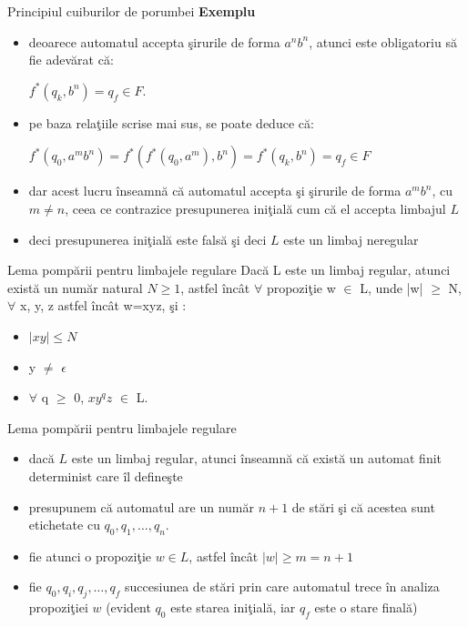 \documentclass[pdf]{beamer}
\begin{document}
\begin{frame}{Principiul cuiburilor de porumbei}
\textbf{Exemplu}
\begin{itemize}
\item
deoarece automatul accepta şirurile de forma $ a^n b^n $, atunci este obligatoriu să fie adevărat că:

$ f^* (q_k, b^n) = q_f \in F $.
\item
pe baza relaţiile scrise mai sus, se poate deduce că:

$ f^* (q_0, a^m b^n) = f^* (f^* (q_0, a^m), b^n) = f^* (q_k, b^n) = q_f \in F$ 
\item
dar acest lucru înseamnă că automatul accepta şi şirurile de forma $ a^m b^n $, cu $ m \neq n $, ceea ce contrazice presupunerea iniţială cum că el accepta limbajul $ L $
\item
deci presupunerea iniţială este falsă şi deci $ L $ este un limbaj neregular
\end{itemize}
\end{frame}



\begin{frame}{Lema pompării pentru limbajele regulare}
Dacă L este un limbaj regular, atunci există un număr natural $N \geq 1$, astfel încât $\forall$ propoziţie w $\in$ L, unde |w| $\geq$ N, $\forall$ x, y, z astfel încât w=xyz, şi :
\begin{itemize}
\item
$|xy| \leq N$
\item
y $\neq$ $\epsilon$
\item
$\forall$ q $\geq$ 0, $xy^{q}z$ $\in$ L.
\end{itemize}
\end{frame}



\begin{frame}{Lema pompării pentru limbajele regulare}
\begin{itemize}
\item
dacă $ L $ este un limbaj regular, atunci înseamnă că există un automat finit determinist care îl defineşte
\item
presupunem că automatul are un număr $ n + 1 $ de stări şi că acestea sunt etichetate cu $ q_0, q_1, \dots, q_n $. 
\item
fie atunci o propoziţie $ w \in L $, astfel încât $ |w| \geq m = n +1 $ 
\item
fie $ q_0, q_i, q_j, \dots, q_f $ succesiunea de stări prin care automatul trece în analiza propoziţiei $ w $ (evident $ q_0 $ este starea iniţială, iar $ q_f $ este o stare finală)
\end{itemize}
\end{frame}
\end{document}
